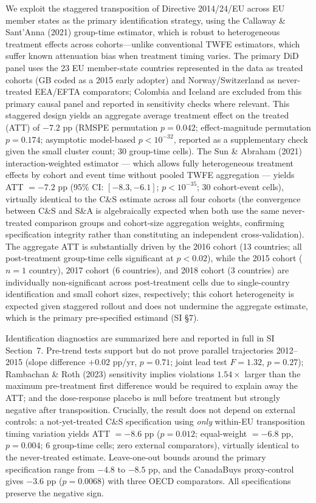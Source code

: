 \documentclass[11pt,a4paper]{article}
\begin{document}
We exploit the staggered transposition of Directive 2014/24/EU across EU member states as the primary identification strategy, using the Callaway \& Sant'Anna (2021)\cite{callaway2021difference} group-time estimator, which is robust to heterogeneous treatment effects across cohorts---unlike conventional TWFE estimators, which suffer known attenuation bias when treatment timing varies\cite{goodmanbacon2021did,dechaisemartin2020twfe}. The primary DiD panel uses the 23 EU member-state countries represented in the data as treated cohorts (GB coded as a 2015 early adopter) and Norway/Switzerland as never-treated EEA/EFTA comparators; Colombia and Iceland are excluded from this primary causal panel and reported in sensitivity checks where relevant. This staggered design yields an aggregate average treatment effect on the treated (ATT) of $-7.2$ pp (RMSPE permutation $p = 0.042$; effect-magnitude permutation $p = 0.174$; asymptotic model-based $p < 10^{-32}$, reported as a supplementary check given the small cluster count; 30 group-time cells). The Sun \& Abraham (2021)\cite{sunabraham2021} interaction-weighted estimator --- which allows fully heterogeneous treatment effects by cohort and event time without pooled TWFE aggregation --- yields ATT $= -7.2$ pp (95\% CI: $[-8.3, -6.1]$; $p < 10^{-35}$; 30 cohort-event cells), virtually identical to the C\&S estimate across all four cohorts (the convergence between C\&S and S\&A is algebraically expected when both use the same never-treated comparison groups and cohort-size aggregation weights, confirming specification integrity rather than constituting an independent cross-validation). The aggregate ATT is substantially driven by the 2016 cohort (13 countries; all post-treatment group-time cells significant at $p < 0.02$), while the 2015 cohort ($n = 1$ country), 2017 cohort (6 countries), and 2018 cohort (3 countries) are individually non-significant across post-treatment cells due to single-country identification and small cohort sizes, respectively; this cohort heterogeneity is expected given staggered rollout and does not undermine the aggregate estimate, which is the primary pre-specified estimand (SI \S7). 

Identification diagnostics are summarized here and reported in full in SI Section~7. Pre-trend tests support but do not prove parallel trajectories 2012--2015 (slope difference $+0.02$ pp/yr, $p = 0.71$; joint lead test $F = 1.32$, $p = 0.27$\cite{roth2022pretrends}); Rambachan \& Roth (2023)\cite{rambachan2023} sensitivity implies violations $1.54{\times}$ larger than the maximum pre-treatment first difference would be required to explain away the ATT; and the dose-response placebo is null before treatment but strongly negative after transposition. Crucially, the result does not depend on external controls: a not-yet-treated C\&S specification using \textit{only} within-EU transposition timing variation yields ATT $= -8.6$ pp ($p = 0.012$; equal-weight $= -6.8$ pp, $p = 0.004$; 6 group-time cells; zero external comparators), virtually identical to the never-treated estimate. Leave-one-out bounds around the primary specification range from $-4.8$ to $-8.5$ pp, and the CanadaBuys proxy-control gives $-3.6$ pp ($p = 0.0068$) with three OECD comparators. All specifications preserve the negative sign.
\end{document}
